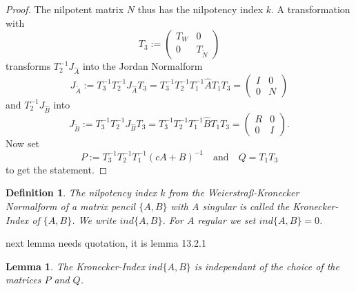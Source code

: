 \documentclass[11pt,titlepage]{article}
\newtheorem{definition}{Definition}
\newtheorem{lemma}{Lemma}
\begin{document}
\begin{proof}
					
					The nilpotent matrix $N$ thus has the nilpotency index $k$. A transformation with
					\begin{displaymath}
						T_3 := 
						\left(
						\begin{matrix}
							T_W & 0 \\
							0 & T_{\tilde{N}}
						\end{matrix}
						\right)
					\end{displaymath}
					transforms $T_2^{-1}J_{\hat{A}}$ into the Jordan Normalform
					\begin{displaymath}
						J_{\tilde{A}} := T_3^{-1}T_2^{-1}J_{\hat{A}}T_3 = T_3^{-1}T_2^{-1}T_1^{-1}\hat{A}T_1T_3 = 
						\left(
						\begin{matrix}
							I & 0 \\
							0 & N
						\end{matrix}
						\right)
					\end{displaymath}
					and $T_2^{-1}J_{\hat{B}}$ into
					\begin{displaymath}
						J_{\tilde{B}} := T_3^{-1}T_2^{-1}J_{\hat{B}}T_3 = T_3^{-1}T_2^{-1}T_1^{-1}\hat{B}T_1T_3 = 
						\left(
						\begin{matrix}
							R & 0 \\
							0 & I
						\end{matrix}
						\right) .
					\end{displaymath}
					Now set
					\begin{displaymath}
						P:= T_3^{-1}T_2^{-1}T_1^{-1}(cA+B)^{-1} \quad \text{and} \quad Q = T_1T_3
					\end{displaymath}
					to get the statement.
				\end{proof}
				
				\begin{definition}
					The nilpotency index $k$ from the Weierstraß-Kronecker Normalform of a matrix pencil $\{A,B\}$ with $A$ singular is called the \emph{Kronecker-Index} of $\{A,B\}$. We write $ind\{A,B\}$. For $A$ regular we set $ind\{A,B\} = 0$.
				\end{definition}
				
				next lemma needs quotation, it is lemma 13.2.1
				
				\begin{lemma}
					The Kronecker-Index $ind\{A,B\}$ is independant of the choice of the matrices $P$ and $Q$.
				\end{lemma}
				
\end{document}
